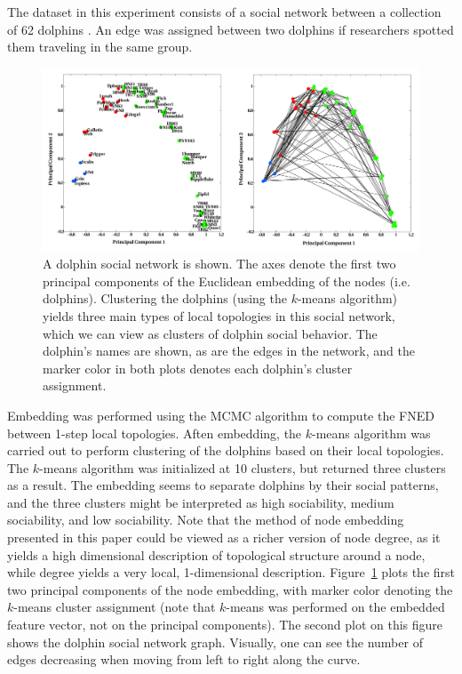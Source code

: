 \documentclass[10pt,twocolumn,fleqn]{article}
\begin{document}
The dataset in this experiment consists of a social network between a collection of 62 dolphins \cite{bottleNoseDolphinPeople}. An edge was assigned between two dolphins if researchers spotted them traveling in the same group.
\begin{figure}[!]
  \centering               
  \includegraphics[width=1\textwidth]{../img/demo5_dolphinSocialNetwork/dolphinFigure.pdf}
  \caption{A dolphin social network is shown. The axes denote the first two principal components of the Euclidean embedding of the nodes (i.e. dolphins). Clustering the dolphins (using the $k$-means algorithm) yields three main types of local topologies in this social network, which we can view as clusters of dolphin social behavior. The dolphin's names are shown, as are the edges in the network, and the marker color in both plots denotes each dolphin's cluster assignment.}
  \label{fig:dolphinSocialNetwork}
\end{figure}

Embedding was performed using the MCMC algorithm to compute the FNED between 1-step local topologies. Aften embedding, the $k$-means algorithm was carried out to perform clustering of the dolphins based on their local topologies. The $k$-means algorithm was initialized at 10 clusters, but returned three clusters as a result. The embedding seems to separate dolphins by their social patterns, and the three clusters might be interpreted as high sociability, medium sociability, and low sociability. Note that the method of node embedding presented in this paper could be viewed as a richer version of node degree, as it yields a high dimensional description of topological structure around a node, while degree yields a very local, 1-dimensional description. Figure~\ref{fig:dolphinSocialNetwork} plots the first two principal components of the node embedding, with marker color denoting the $k$-means cluster assignment (note that $k$-means was performed on the embedded feature vector, not on the principal components). The second plot on this figure shows the dolphin social network graph. Visually, one can see the number of edges decreasing when moving from left to right along the curve.
\end{document}
